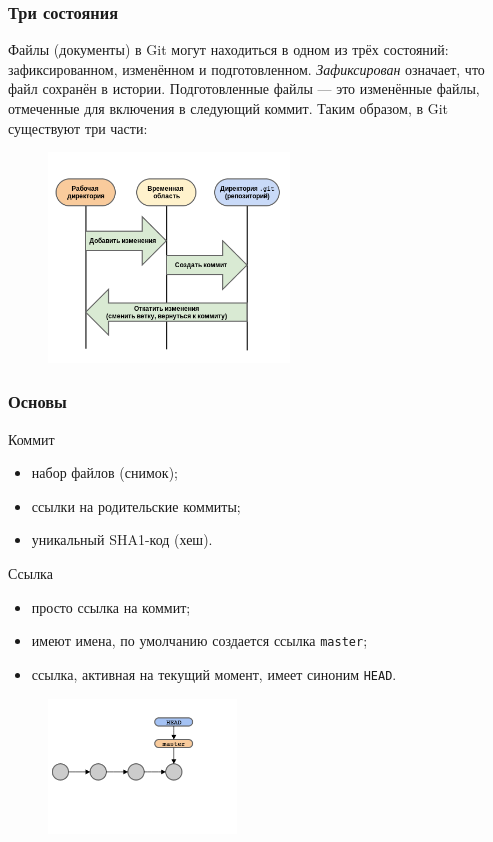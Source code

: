 \documentclass{beamer}
\begin{document}
\begin{frame}
  \frametitle{Три состояния}
  Файлы (документы) в Git могут находиться в одном из трёх состояний: зафиксированном,
  изменённом и подготовленном. {\it Зафиксирован} означает, что файл сохранён в истории.
  Подготовленные файлы --- это изменённые файлы, отмеченные для включения в следующий
  коммит. Таким образом, в Git существуют три части:

  \begin{figure}
     \includegraphics[width=6.4cm]{images/git-sections.png}
  \end{figure}
\end{frame}

\begin{frame}
  \frametitle{Основы}
  \begin{block}{Коммит}
    \begin{itemize}
      \item набор файлов (снимок);
      \item ссылки на родительские коммиты;
      \item уникальный SHA1-код (хеш).
    \end{itemize}
  \end{block}

  \begin{block}{Ссылка}
    \begin{itemize}
      \item просто ссылка на коммит;
      \item имеют имена, по умолчанию создается ссылка \texttt{master};
      \item ссылка, активная на текущий момент, имеет синоним \texttt{HEAD}.
    \end{itemize}
  \end{block}

  \begin{figure}
     \includegraphics[width=5cm]{images/git-simple-repo.png}
  \end{figure}
\end{frame}
\end{document}
